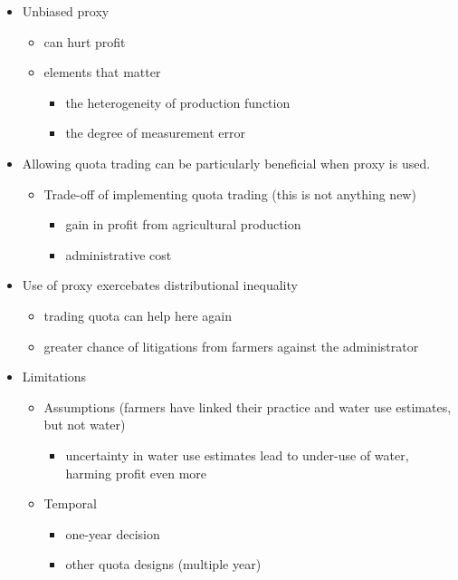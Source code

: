 \documentclass[
]{article}
\providecommand{\tightlist}{%
  \setlength{\itemsep}{0pt}\setlength{\parskip}{0pt}}
\begin{document}
\begin{itemize}
\tightlist
\item
  Unbiased proxy

  \begin{itemize}
  \tightlist
  \item
    can hurt profit\\
  \item
    elements that matter

    \begin{itemize}
    \tightlist
    \item
      the heterogeneity of production function
    \item
      the degree of measurement error
    \end{itemize}
  \end{itemize}
\item
  Allowing quota trading can be particularly beneficial when proxy is used.

  \begin{itemize}
  \tightlist
  \item
    Trade-off of implementing quota trading (this is not anything new)

    \begin{itemize}
    \tightlist
    \item
      gain in profit from agricultural production
    \item
      administrative cost
    \end{itemize}
  \end{itemize}
\item
  Use of proxy exercebates distributional inequality

  \begin{itemize}
  \tightlist
  \item
    trading quota can help here again
  \item
    greater chance of litigations from farmers against the administrator
  \end{itemize}
\item
  Limitations

  \begin{itemize}
  \tightlist
  \item
    Assumptions (farmers have linked their practice and water use estimates, but not water)

    \begin{itemize}
    \tightlist
    \item
      uncertainty in water use estimates lead to under-use of water, harming profit even more
    \end{itemize}
  \item
    Temporal

    \begin{itemize}
    \tightlist
    \item
      one-year decision
    \item
      other quota designs (multiple year)
    \end{itemize}
  \end{itemize}
\end{itemize}
\end{document}
